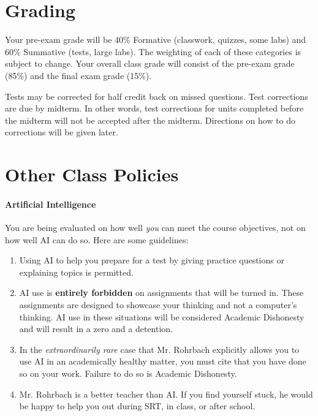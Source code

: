 \documentclass[10pt]{exam}
\begin{document}
\section*{Grading}

Your pre-exam grade will be 40\% Formative (classwork, quizzes, some labs) and 60\% Summative (tests, large labs). The weighting of each of these categories is subject to change. Your overall class grade will consist of the pre-exam grade (85\%) and the final exam grade (15\%).


Tests may be corrected for half credit back on missed 
questions.  Test corrections are due by midterm.  In other words, test corrections for units completed before the midterm will not be accepted after the midterm.  Directions on how to do corrections will be given later.


\section*{Other Class Policies}

\paragraph{Artificial Intelligence}
	You are being evaluated on how well \emph{you} can meet the course objectives, not on how well AI can do so. Here are some guidelines:

	\begin{enumerate}
		\item Using AI to help you prepare for a test by giving practice questions or explaining topics is permitted.
		\item AI use is \textbf{entirely forbidden} on assignments that will be turned in.  These assignments are designed to showcase your thinking and not a computer's thinking.  AI use in these situations will be considered Academic Dishonesty and will result in a zero and a detention.
		\item In the \emph{extraordinarily rare} case that Mr. Rohrbach explicitly allows you to use AI in an academically healthy matter, you must cite that you have done so on your work.  Failure to do so is Academic Dishonesty.
		\item Mr. Rohrbach is a better teacher than AI.  If you find yourself stuck, he would be happy to help you out during SRT, in class, or after school.  
	\end{enumerate}
\end{document}
